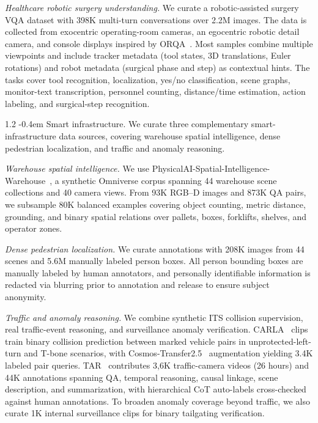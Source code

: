 \documentclass{llmxive}
\makeatletter
\providecommand{\paragraph}{  \@startsection{paragraph}{4}{\z@}    {1\baselineskip \@plus .2\baselineskip}    {-0.4em}    {\normalfont\normalsize\bfseries}}
\makeatother
\begin{document}
\textit{Healthcare robotic surgery understanding.}
We curate a robotic-assisted surgery VQA dataset with 398K multi-turn conversations over 2.2M images. The data is collected from exocentric operating-room cameras, an egocentric robotic detail camera, and console displays inspired by ORQA~\citep{ozsoy2025specializedfoundationmodelsintelligent}. Most samples combine multiple viewpoints and include tracker metadata (tool states, 3D translations, Euler rotations) and robot metadata (surgical phase and step) as contextual hints. The tasks cover tool recognition, localization, yes/no classification, scene graphs, monitor-text transcription, personnel counting, distance/time estimation, action labeling, and surgical-step recognition.

\paragraph{Smart infrastructure.}
We curate three complementary smart-infrastructure data sources, covering warehouse spatial intelligence, dense pedestrian localization, and traffic and anomaly reasoning. 

\textit{Warehouse spatial intelligence.} We use PhysicalAI-Spatial-Intelligence-Warehouse~\citep{tang20259thaicitychallenge}, a synthetic Omniverse corpus spanning 44 warehouse scene collections and 40 camera views. From 93K RGB--D images and 873K QA pairs, we subsample 80K balanced examples covering object counting, metric distance, grounding, and binary spatial relations over pallets, boxes, forklifts, shelves, and operator zones.

\textit{Dense pedestrian localization.} We curate annotations with 208K images from 44 scenes and 5.6M manually labeled person boxes. All person bounding boxes are manually labeled by human annotators, and personally identifiable information is redacted via blurring prior to annotation and release to ensure subject anonymity.

\textit{Traffic and anomaly reasoning.} We combine synthetic ITS collision supervision, real traffic-event reasoning, and surveillance anomaly verification. CARLA~\citep{Dosovitskiy17} clips train binary collision prediction between marked vehicle pairs in unprotected-left-turn and T-bone scenarios, with Cosmos-Transfer2.5~\citep{cosmos_predict2p5} augmentation yielding 3.4K labeled pair queries. TAR~\citep{nvidia2026tar} contributes 3{,}6K traffic-camera videos (26 hours) and 44K annotations spanning QA, temporal reasoning, causal linkage, scene description, and summarization, with hierarchical CoT auto-labels cross-checked against human annotations. To broaden anomaly coverage beyond traffic, we also curate 1K internal surveillance clips for binary tailgating verification.
\end{document}
